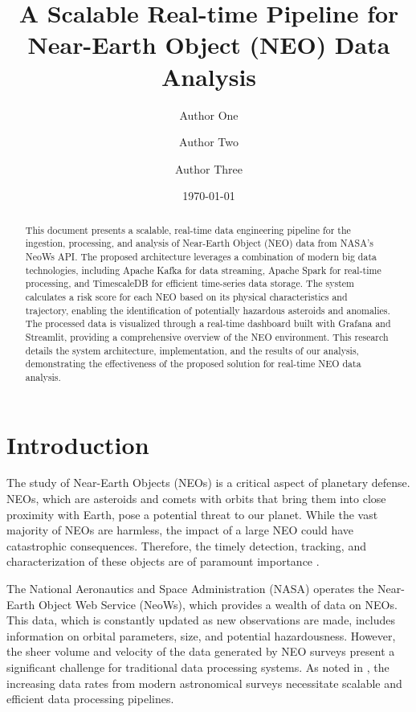 \documentclass{article}
\title{A Scalable Real-time Pipeline for Near-Earth Object (NEO) Data Analysis}
\author[1]{Author One}
\author[2]{Author Two}
\author[3]{Author Three}
\affil[1]{Affiliation 1, email@example.com}
\affil[2]{Affiliation 2, email@example.com}
\affil[3]{Affiliation 3, email@example.com}
\date{\today}
\begin{document}
\maketitle

\begin{abstract}
This document presents a scalable, real-time data engineering pipeline for the ingestion, processing, and analysis of Near-Earth Object (NEO) data from NASA's NeoWs API. The proposed architecture leverages a combination of modern big data technologies, including Apache Kafka for data streaming, Apache Spark for real-time processing, and TimescaleDB for efficient time-series data storage. The system calculates a risk score for each NEO based on its physical characteristics and trajectory, enabling the identification of potentially hazardous asteroids and anomalies. The processed data is visualized through a real-time dashboard built with Grafana and Streamlit, providing a comprehensive overview of the NEO environment. This research details the system architecture, implementation, and the results of our analysis, demonstrating the effectiveness of the proposed solution for real-time NEO data analysis.
\end{abstract}

\tableofcontents

\section{Introduction}

The study of Near-Earth Objects (NEOs) is a critical aspect of planetary defense. NEOs, which are asteroids and comets with orbits that bring them into close proximity with Earth, pose a potential threat to our planet. While the vast majority of NEOs are harmless, the impact of a large NEO could have catastrophic consequences. Therefore, the timely detection, tracking, and characterization of these objects are of paramount importance \cite{hera2018}.

The National Aeronautics and Space Administration (NASA) operates the Near-Earth Object Web Service (NeoWs), which provides a wealth of data on NEOs. This data, which is constantly updated as new observations are made, includes information on orbital parameters, size, and potential hazardousness. However, the sheer volume and velocity of the data generated by NEO surveys present a significant challenge for traditional data processing systems. As noted in \cite{rtapipe2018}, the increasing data rates from modern astronomical surveys necessitate scalable and efficient data processing pipelines.
\end{document}
